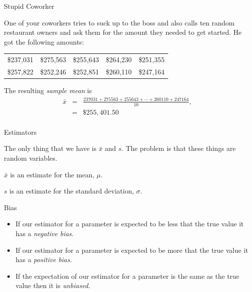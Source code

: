 \begin{frame}{Stupid Coworker}
  
  One of your coworkers tries to suck up to the boss and also calls
  ten random restaurant owners and ask them for the amount they needed
  to get started. He got the following amounts:
  \begin{tabular}{lllll}
    \$237,031 & \$275,563 & \$255,643 & \$264,230 & \$251,355 \\
    \$257,822 & \$252,246 & \$252,851 & \$260,110 & \$247,164
  \end{tabular}

  The resulting \textit{sample mean} is
  \begin{eqnarray*}
    \bar{x} & = &
    \frac{237031+275563+255643+\cdots+260110+247164}{10}, \\
    & = & \$255,401.50\\
  \end{eqnarray*}

  
\end{frame}


\begin{frame}{Estimators}

  The only thing that we have is $\bar{x}$ and $s$. The problem is
  that these things are random variables.

  $\bar{x}$ is an estimate for the mean, $\mu$.

  $s$ is an estimate for the standard deviation, $\sigma$.

  \begin{definition}{Bias}
    \begin{itemize}
    \item If our estimator for a parameter is {\color{red}expected} to be less that
      the true value it has a \textit{\color{blue}negative bias.}
    \item If our estimator for a parameter is {\color{red}expected} to be more that
      the true value it has a \textit{\color{blue} positive bias.}
    \item If the {\color{red}expectation} of our estimator for a parameter is the
      same as the true value then it is \textit{\color{blue} unbiased.}
    \end{itemize}
  \end{definition}
  
  \vfill

\end{frame}

